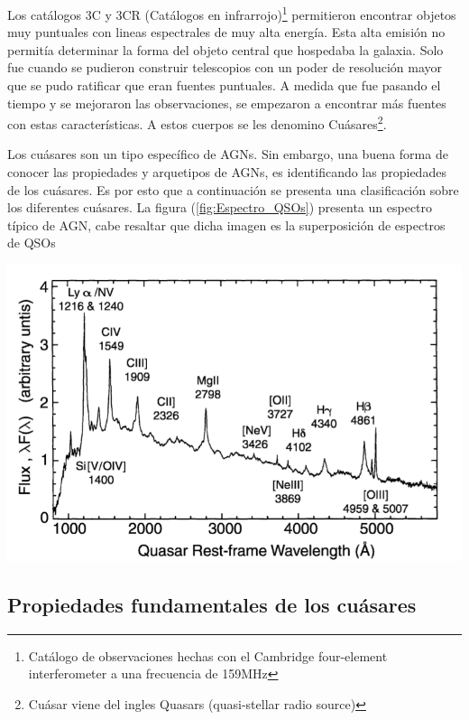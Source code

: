 Los catálogos 3C y 3CR (Catálogos en infrarrojo)\footnote{Catálogo de observaciones hechas con el Cambridge four-element interferometer a una frecuencia de 159MHz} permitieron encontrar objetos muy puntuales 
con lineas espectrales de muy alta energía. 
Esta alta emisión no permitía determinar la forma del objeto central que hospedaba la galaxia. Solo fue cuando se pudieron construir telescopios con un poder de resolución mayor que se pudo ratificar que eran fuentes puntuales. A medida que fue pasando el tiempo y se mejoraron  las observaciones, se empezaron a encontrar más fuentes con estas características. A estos cuerpos se les denomino  Cuásares\footnote{Cuásar viene del ingles Quasars (quasi-stellar radio source)}.

Los cuásares son un tipo específico de AGNs. Sin embargo, una buena forma de conocer las propiedades y arquetipos de  AGNs, es identificando las propiedades de los cuásares. Es por esto que a continuación se presenta una clasificación sobre los diferentes cuásares.  La figura (\ref{fig:Espectro_QSOs}) presenta un espectro típico de AGN, cabe resaltar que dicha imagen es la superposición de espectros de QSOs

\begin{center}
\includegraphics[scale=.3]{./figures/3_AGNs/Espectro_tipico_AGN.png}
\label{fig:Espectro_QSOs}
\end{center}
	\subsection{Propiedades fundamentales de los cuásares}
	\label{subsec:Fundamental_properties_quasars}

